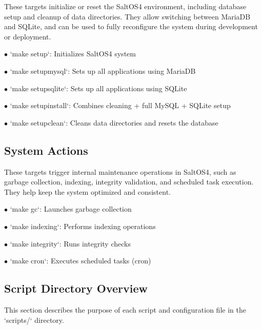 \documentclass[a4paper]{article}
\begin{document}
These targets initialize or reset the SaltOS4 environment, including database setup and cleanup of data directories. They allow switching between MariaDB and SQLite, and can be used to fully reconfigure the system during development or deployment.

\begin{compactitem}
\item[\color{myblue}$\bullet$] `make setup`: Initializes SaltOS4 system
\item[\color{myblue}$\bullet$] `make setupmysql`: Sets up all applications using MariaDB
\item[\color{myblue}$\bullet$] `make setupsqlite`: Sets up all applications using SQLite
\item[\color{myblue}$\bullet$] `make setupinstall`: Combines cleaning + full MySQL + SQLite setup
\item[\color{myblue}$\bullet$] `make setupclean`: Cleans data directories and resets the database
\end{compactitem}

\hypertarget{toc49}{}
\subsection{System Actions}

These targets trigger internal maintenance operations in SaltOS4, such as garbage collection, indexing, integrity validation, and scheduled task execution. They help keep the system optimized and consistent.

\begin{compactitem}
\item[\color{myblue}$\bullet$] `make gc`: Launches garbage collection
\item[\color{myblue}$\bullet$] `make indexing`: Performs indexing operations
\item[\color{myblue}$\bullet$] `make integrity`: Runs integrity checks
\item[\color{myblue}$\bullet$] `make cron`: Executes scheduled tasks (cron)
\end{compactitem}

\hypertarget{toc50}{}
\subsection{Script Directory Overview}

This section describes the purpose of each script and configuration file in the `scripts/` directory.
\end{document}
